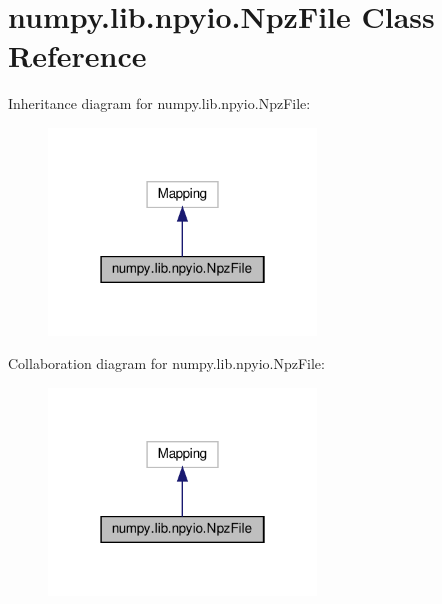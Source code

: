 \hypertarget{classnumpy_1_1lib_1_1npyio_1_1NpzFile}{}\section{numpy.\+lib.\+npyio.\+Npz\+File Class Reference}
\label{classnumpy_1_1lib_1_1npyio_1_1NpzFile}


Inheritance diagram for numpy.\+lib.\+npyio.\+Npz\+File\+:
\nopagebreak
\begin{figure}[H]
\begin{center}
\leavevmode
\includegraphics[width=202pt]{classnumpy_1_1lib_1_1npyio_1_1NpzFile__inherit__graph}
\end{center}
\end{figure}


Collaboration diagram for numpy.\+lib.\+npyio.\+Npz\+File\+:
\nopagebreak
\begin{figure}[H]
\begin{center}
\leavevmode
\includegraphics[width=202pt]{classnumpy_1_1lib_1_1npyio_1_1NpzFile__coll__graph}
\end{center}
\end{figure}
